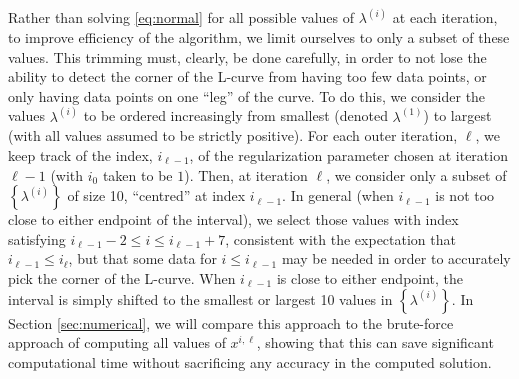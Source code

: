 Rather than solving \eqref{eq:normal} for all possible values of
$\lambda^{(i)}$ at each iteration, to improve efficiency of the
algorithm, we limit ourselves to only a subset of these values.
This trimming must, clearly, be done carefully, in order to not lose
the ability to detect the corner of the L-curve from having too few
data points, or only having data points on one ``leg'' of the curve.
To do this, we consider the values $\lambda^{(i)}$ to be ordered
increasingly from smallest (denoted $\lambda^{(1)}$) to largest (with
all values assumed to be strictly positive).  For each outer
iteration, $\ell$, we keep track of the index, $i_{\ell-1}$, of the
regularization parameter chosen at iteration $\ell-1$ (with $i_0$
taken to be $1$).  Then, at iteration $\ell$, we consider only a subset
of $\left\{\lambda^{(i)}\right\}$ of size 10, ``centred'' at index
$i_{\ell-1}$.  In general (when $i_{\ell-1}$ is not too close to
either endpoint of the interval), we select those values with index
satisfying $i_{\ell-1}-2 \leq i \leq i_{\ell-1}+7$, consistent with
the expectation that $i_{\ell-1} \leq i_\ell$, but that some data for
$i \leq i_{\ell-1}$ may be needed in order to accurately pick the
corner of the L-curve.  When $i_{\ell-1}$ is close to either endpoint,
the interval is simply shifted to the smallest or largest 10 values in
$\left\{\lambda^{(i)}\right\}$.  In Section \ref{sec:numerical}, we
will compare this approach to the brute-force approach of computing
all values of $x^{i,\ell}$, showing that this can save significant
computational time without sacrificing any accuracy in the computed
solution.

